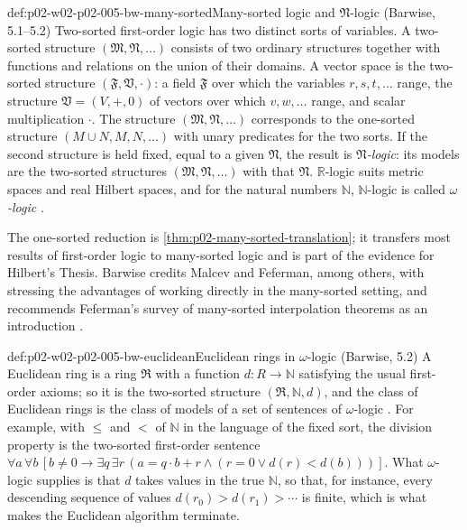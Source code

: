 \begin{hbdefinition}{def:p02-w02-p02-005-bw-many-sorted}{Many-sorted logic and \(\mathfrak N\)-logic (Barwise, 5.1--5.2)}
Two-sorted first-order logic has two distinct sorts of variables.  A
two-sorted structure \((\mathfrak M,\mathfrak N,\ldots)\) consists of two
ordinary structures together with functions and relations on the union of
their domains.  A vector space is the two-sorted structure
\((\mathfrak F,\mathfrak V,\cdot)\): a field \(\mathfrak F\) over which the
variables \(r,s,t,\ldots\) range, the structure
\(\mathfrak V=(V,+,0)\) of vectors over which \(v,w,\ldots\) range, and
scalar multiplication \(\cdot\).  The structure
\((\mathfrak M,\mathfrak N,\ldots)\) corresponds to the one-sorted
structure \((M\cup N,M,N,\ldots)\) with unary predicates for the two sorts.
If the second structure is held fixed, equal to a given \(\mathfrak N\), the
result is \emph{\(\mathfrak N\)-logic}: its models are the two-sorted
structures \((\mathfrak M,\mathfrak N,\ldots)\) with that \(\mathfrak N\).
\(\mathbb R\)-logic suits metric spaces and real Hilbert spaces, and for the
natural numbers \(\mathbb N\), \(\mathbb N\)-logic is called
\emph{\(\omega\)-logic} \cite[ch.~A.1, \S5, 5.1--5.2, p.~42]{Barwise1977FirstOrder}.
\end{hbdefinition}

The one-sorted reduction is \cref{thm:p02-many-sorted-translation}; it
transfers most results of first-order logic to many-sorted logic and is
part of the evidence for Hilbert's Thesis.  Barwise credits Malcev and
Feferman, among others, with stressing the advantages of working directly
in the many-sorted setting, and recommends Feferman's survey of many-sorted
interpolation theorems \cite{Feferman1974ManySorted} as an introduction
\cite[ch.~A.1, \S5, p.~42]{Barwise1977FirstOrder}.

\begin{hbexample}{def:p02-w02-p02-005-bw-euclidean}{Euclidean rings in \(\omega\)-logic (Barwise, 5.2)}
A Euclidean ring is a ring \(\mathfrak R\) with a function
\(d:R\to\mathbb N\) satisfying the usual first-order axioms; so it is the
two-sorted structure \((\mathfrak R,\mathbb N,d)\), and the class of
Euclidean rings is the class of models of a set of sentences of
\(\omega\)-logic \cite[ch.~A.1, \S5, p.~42]{Barwise1977FirstOrder}.  For
example, with \(\leq\) and \(<\) of \(\mathbb N\) in the language of the
fixed sort, the division property is the two-sorted first-order sentence
\(\forall a\,\forall b\,[b\neq0\to\exists q\,\exists r\,(a=q\cdot b+r\land
(r=0\lor d(r)<d(b)))]\).  What \(\omega\)-logic supplies is that \(d\)
takes values in the true \(\mathbb N\), so that, for instance, every
descending sequence of values \(d(r_0)>d(r_1)>\cdots\) is finite, which is
what makes the Euclidean algorithm terminate.
\end{hbexample}

